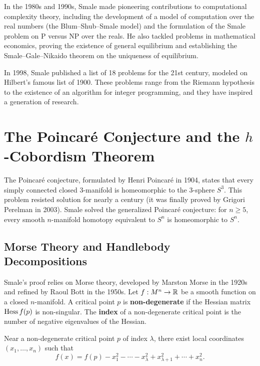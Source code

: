In the 1980s and 1990s, Smale made pioneering contributions to computational complexity theory, including the development of a model of computation over the real numbers (the Blum--Shub--Smale model) and the formulation of the Smale problem on P versus NP over the reals. He also tackled problems in mathematical economics, proving the existence of general equilibrium and establishing the Smale--Gale--Nikaido theorem on the uniqueness of equilibrium.

In 1998, Smale published a list of 18 problems for the 21st century, modeled on Hilbert's famous list of 1900. These problems range from the Riemann hypothesis to the existence of an algorithm for integer programming, and they have inspired a generation of research.

\section{The Poincar\'e Conjecture and the \texorpdfstring{\(h\)}{h}-Cobordism Theorem}

The Poincar\'e conjecture, formulated by Henri Poincar\'e in 1904, states that every simply connected closed 3-manifold is homeomorphic to the 3-sphere \(S^3\). This problem resisted solution for nearly a century (it was finally proved by Grigori Perelman in 2003). Smale solved the generalized Poincar\'e conjecture: for \(n \geq 5\), every smooth \(n\)-manifold homotopy equivalent to \(S^n\) is homeomorphic to \(S^n\).

\subsection{Morse Theory and Handlebody Decompositions}

Smale's proof relies on Morse theory, developed by Marston Morse in the 1920s and refined by Raoul Bott in the 1950s. Let \(f: M^n \to \mathbb{R}\) be a smooth function on a closed \(n\)-manifold. A critical point \(p\) is \textbf{non-degenerate} if the Hessian matrix \(\operatorname{Hess} f(p)\) is non-singular. The \textbf{index} of a non-degenerate critical point is the number of negative eigenvalues of the Hessian.

\begin{theorem}
Near a non-degenerate critical point \(p\) of index \(\lambda\), there exist local coordinates \((x_1,\dots,x_n)\) such that
\[
f(x) = f(p) - x_1^2 - \cdots - x_\lambda^2 + x_{\lambda+1}^2 + \cdots + x_n^2.
\]
\end{theorem}

